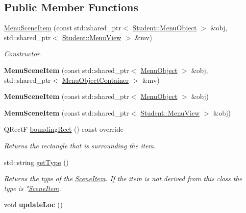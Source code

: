 \subsection*{Public Member Functions}
\begin{DoxyCompactItemize}
\item 
\hyperlink{class_student_1_1_menu_scene_item_a47ca6a8d64cb3562096fa66797dbf057}{Menu\-Scene\-Item} (const std\-::shared\-\_\-ptr$<$ \hyperlink{class_student_1_1_menu_object}{Student\-::\-Menu\-Object} $>$ \&obj, std\-::shared\-\_\-ptr$<$ \hyperlink{class_student_1_1_menu_view}{Student\-::\-Menu\-View} $>$ \&mv)
\begin{DoxyCompactList}\small\item\em Constructor. \end{DoxyCompactList}\item 
\hypertarget{class_student_1_1_menu_scene_item_a5013b6f0b17382ca4602a36c7d181dff}{{\bfseries Menu\-Scene\-Item} (const std\-::shared\-\_\-ptr$<$ \hyperlink{class_student_1_1_menu_object}{Menu\-Object} $>$ \&obj, std\-::shared\-\_\-ptr$<$ \hyperlink{class_student_1_1_menu_object_container}{Menu\-Object\-Container} $>$ \&mv)}\label{class_student_1_1_menu_scene_item_a5013b6f0b17382ca4602a36c7d181dff}

\item 
\hypertarget{class_student_1_1_menu_scene_item_a0e13f50b4953fc354c592396a8d6727a}{{\bfseries Menu\-Scene\-Item} (const std\-::shared\-\_\-ptr$<$ \hyperlink{class_student_1_1_menu_object}{Menu\-Object} $>$ \&obj)}\label{class_student_1_1_menu_scene_item_a0e13f50b4953fc354c592396a8d6727a}

\item 
\hypertarget{class_student_1_1_menu_scene_item_aa1712b1a6fc30edaf14ecf377e35a93e}{{\bfseries Menu\-Scene\-Item} (const std\-::shared\-\_\-ptr$<$ \hyperlink{class_student_1_1_menu_view}{Student\-::\-Menu\-View} $>$ \&obj)}\label{class_student_1_1_menu_scene_item_aa1712b1a6fc30edaf14ecf377e35a93e}

\item 
Q\-Rect\-F \hyperlink{class_student_1_1_menu_scene_item_a2904ab61b774f21cd2ac24599b222e1c}{bounding\-Rect} () const override
\begin{DoxyCompactList}\small\item\em Returns the rectangle that is surrounding the item. \end{DoxyCompactList}\item 
std\-::string \hyperlink{class_student_1_1_menu_scene_item_accd8c83c00abf1f60b36eb50e133cc27}{get\-Type} ()
\begin{DoxyCompactList}\small\item\em Returns the type of the \hyperlink{class_student_1_1_scene_item}{Scene\-Item}. If the item is not derived from this class the type is "\hyperlink{class_student_1_1_scene_item}{Scene\-Item}. \end{DoxyCompactList}\item 
\hypertarget{class_student_1_1_menu_scene_item_a1aace80525b18a436115d65404cbe253}{void {\bfseries update\-Loc} ()}\label{class_student_1_1_menu_scene_item_a1aace80525b18a436115d65404cbe253}


\end{DoxyCompactItemize}
